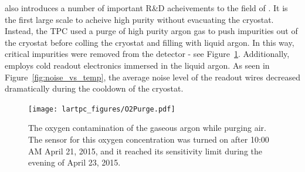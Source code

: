\uboone also introduces a number of important R\&D acheivements to the field of \lartpcs.  It is the first large scale \lartpc to acheive high purity without evacuating the cryostat.  Instead, the TPC used a purge of high purity argon gas to push impurities out of the cryostat before colling the cryostat and filling with liquid argon.   In this way, critical impurities were removed from the detector - see Figure~\ref{fig:o2purge}.  Additionally, \uboone employs cold readout electronics immersed in the liquid argon.  As seen in Figure~\ref{fig:noise_vs_temp}, the average noise level of the readout wires decreased dramatically during the cooldown of the \uboone cryostat.

\begin{figure}[htb]
  \centering
  \texttt{[image: lartpc\_figures/O2Purge.pdf]}
  \caption[\uboone O2 Contamination]{The oxygen contamination of the gaseous argon while purging air. The sensor for this oxygen concentration was turned on after 10:00 AM April 21, 2015, and it reached its sensitivity limit during the evening of April 23, 2015. \cite{uboone_pub_1003}}
  \label{fig:o2purge}
\end{figure}



